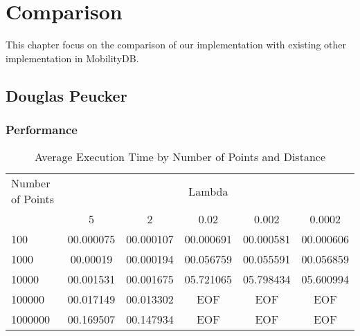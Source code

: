 

\chapter{Comparison}
This chapter focus on the comparison of our implementation with existing other implementation in MobilityDB.

\section{Douglas Peucker}
\subsection{Performance}


\begin{table}[htbp]
    \centering
    \label{tab:execution_time_douglas}
    \begin{tabular}{@{}lccccc@{}}
        \toprule
        Number of Points & \multicolumn{5}{c}{Lambda} \\
        \cmidrule{2-6}
        & 5         & 2       & 0.02        & 0.002       & 0.0002       \\
        \midrule
        100              & 00.000075 & 00.000107 & 00.000691 & 00.000581 & 00.000606 \\
        1000             & 00.00019  & 00.000194 & 00.056759 & 00.055591 & 00.056859 \\
        10000            & 00.001531 & 00.001675 & 05.721065 & 05.798434 & 05.600994 \\
        100000           & 00.017149  & 00.013302  & EOF & EOF & EOF \\
        1000000          & 00.169507 & 00.147934 & EOF & EOF & EOF \\
        \bottomrule
    \end{tabular}
    \caption{Average Execution Time by Number of Points and Distance}
\end{table}

